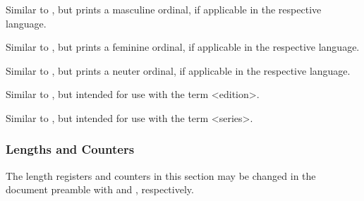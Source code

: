 \documentclass{ltxdockit}[2011/03/25]
\begin{document}
\begin{ltxsyntax}
Similar to , but prints a masculine ordinal, if applicable in the respective language.


Similar to , but prints a feminine ordinal, if applicable in the respective language.


Similar to , but prints a neuter ordinal, if applicable in the respective language.


Similar to , but intended for use with the term <edition>.


Similar to , but intended for use with the term <series>.

\end{ltxsyntax}

\subsubsection{Lengths and Counters}
\label{use:fmt:len}

The length registers and counters in this section may be changed in the document preamble with  and , respectively.
\end{document}
